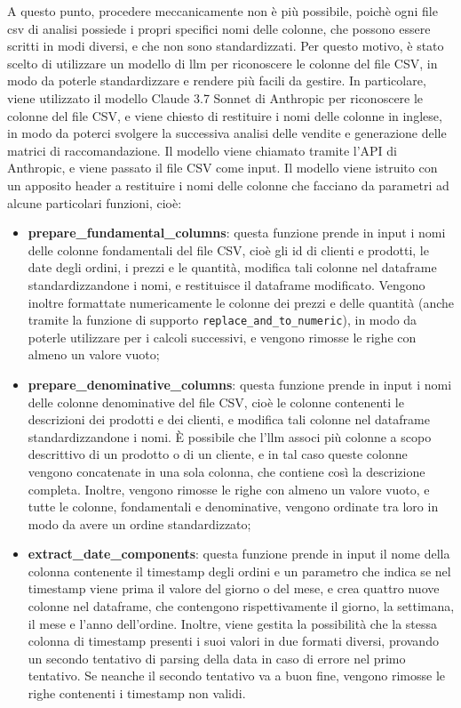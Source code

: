 A questo punto, procedere meccanicamente non è più possibile, poichè ogni file csv di analisi possiede i propri specifici nomi delle colonne, che possono essere scritti in modi diversi, e che non sono standardizzati. Per questo motivo, è stato scelto di utilizzare un modello di \gls{llm} per riconoscere le colonne del file CSV, in modo da poterle standardizzare e rendere più facili da gestire. In particolare, viene utilizzato il modello Claude 3.7 Sonnet di Anthropic per riconoscere le colonne del file CSV, e viene chiesto di restituire i nomi delle colonne in inglese, in modo da poterci svolgere la successiva analisi delle vendite e generazione delle matrici di raccomandazione. Il modello viene chiamato tramite l'API di Anthropic, e viene passato il file CSV come input. Il modello viene istruito con un apposito header a restituire i nomi delle colonne che facciano da parametri ad alcune particolari funzioni, cioè:
\begin{itemize}
    \item \textbf{prepare\_fundamental\_columns}: questa funzione prende in input i nomi delle colonne fondamentali del file CSV, cioè gli id di clienti e prodotti, le date degli ordini, i prezzi e le quantità, modifica tali colonne nel dataframe standardizzandone i nomi, e restituisce il dataframe modificato. Vengono inoltre formattate numericamente le colonne dei prezzi e delle quantità (anche tramite la funzione di supporto \texttt{replace\_and\_to\_numeric}), in modo da poterle utilizzare per i calcoli successivi, e vengono rimosse le righe con almeno un valore vuoto;
    \item \textbf{prepare\_denominative\_columns}: questa funzione prende in input i nomi delle colonne denominative del file CSV, cioè le colonne contenenti le descrizioni dei prodotti e dei clienti, e modifica tali colonne nel dataframe standardizzandone i nomi. È possibile che l'\gls{llm} associ più colonne a scopo descrittivo di un prodotto o di un cliente, e in tal caso queste colonne vengono concatenate in una sola colonna, che contiene così la descrizione completa. Inoltre, vengono rimosse le righe con almeno un valore vuoto, e tutte le colonne, fondamentali e denominative, vengono ordinate tra loro in modo da avere un ordine standardizzato;
    \item \textbf{extract\_date\_components}: questa funzione prende in input il nome della colonna contenente il timestamp degli ordini e un parametro che indica se nel timestamp viene prima il valore del giorno o del mese, e crea quattro nuove colonne nel dataframe, che contengono rispettivamente il giorno, la settimana, il mese e l'anno dell'ordine. Inoltre, viene gestita la possibilità che la stessa colonna di timestamp presenti i suoi valori in due formati diversi, provando un secondo tentativo di parsing della data in caso di errore nel primo tentativo. Se neanche il secondo tentativo va a buon fine, vengono rimosse le righe contenenti i timestamp non validi.
\end{itemize}

